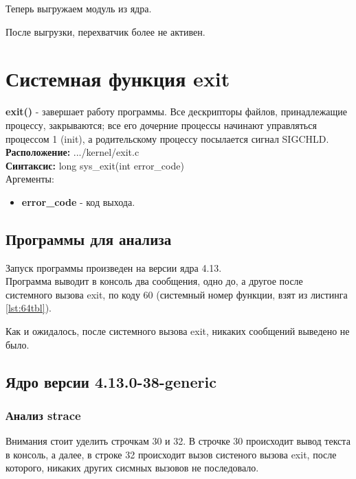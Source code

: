 Теперь выгружаем модуль из ядра.

После выгрузки, перехватчик более не активен.


\section{Системная функция exit}
\textbf{exit()}\cite{exit} - завершает работу программы. Все дескрипторы файлов, принадлежащие процессу, закрываются; все его дочерние процессы начинают управляться процессом 1 (init), а родительскому процессу посылается сигнал SIGCHLD.\\
\textbf{Расположение: }.../kernel/exit.c\\
\textbf{Синтаксис: } long sys\_exit(int error\_code)\\
Аргементы:
\begin{itemize}
\item \textbf{error\_code} - код выхода.
\end{itemize}

\subsection{Программы для анализа}
Запуск программы произведен на версии ядра 4.13.\\

Программа выводит в консоль два сообщения, одно до, а другое после системного вызова exit, по коду 60 (системный номер функции, взят из листинга \ref{lst:64tbl}).


Как и ожидалось, после системного вызова exit, никаких сообщений выведено не было.

\subsection{Ядро версии 4.13.0-38-generic}
\subsubsection{Анализ strace}

Внимания стоит уделить строчкам 30 и 32. В строчке 30 происходит вывод текста в консоль, а далее, в строке 32 происходит вызов систеного вызова exit, после которого, никаких других сисмных вызовов не последовало.
